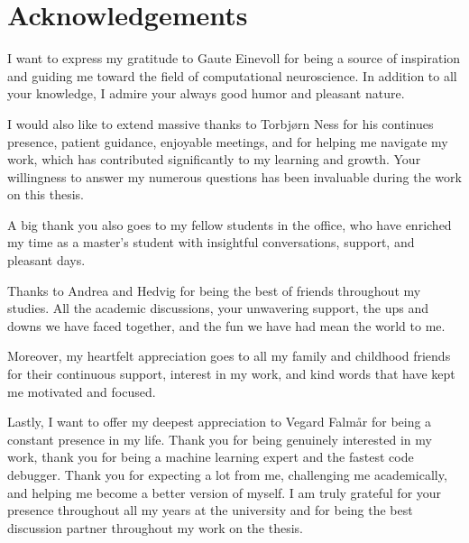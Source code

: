 \documentclass[a4paper, UKenglish, 11pt]{uiomaster}
\begin{document}
\chapter{Acknowledgements}
I want to express my gratitude to Gaute Einevoll for being a source of inspiration and guiding me toward the field of computational neuroscience. In addition to all your knowledge, I admire your always good humor and pleasant nature.

I would also like to extend massive thanks to Torbjørn Ness for his continues presence, patient guidance, enjoyable meetings, and for helping me navigate my work, which has contributed significantly to my learning and growth. Your willingness to answer my numerous questions has been invaluable during the work on this thesis.

A big thank you also goes to my fellow students in the office, who have enriched my time as a master's student with insightful conversations, support, and pleasant days.

Thanks to Andrea and Hedvig for being the best of friends throughout my studies. All the academic discussions, your unwavering support, the ups and downs we have faced together, and the fun we have had mean the world to me.

Moreover, my heartfelt appreciation goes to all my family and childhood friends for their continuous support, interest in my work, and kind words that have kept me motivated and focused.

Lastly, I want to offer my deepest appreciation to Vegard Falmår for being a constant presence in my life. Thank you for being genuinely interested in my work, thank you for being a machine learning expert and the fastest code debugger. Thank you for expecting a lot from me, challenging me academically, and helping me become a better version of myself. I am truly grateful for your presence throughout all my years at the university and for being the best discussion partner throughout my work on the thesis.
\end{document}
